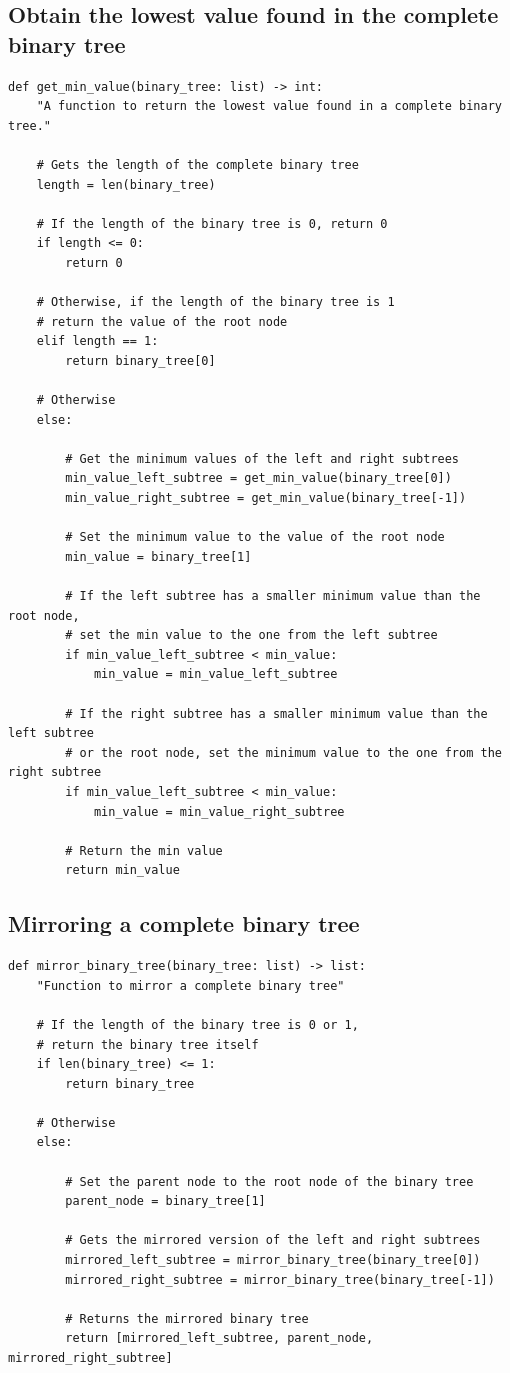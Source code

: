 \documentclass[11pt]{article}
\begin{document}
\subsection{Obtain the lowest value found in the complete binary tree}
\label{sec:org2b8926c}
\begin{verbatim}
def get_min_value(binary_tree: list) -> int:
    "A function to return the lowest value found in a complete binary tree."

    # Gets the length of the complete binary tree
    length = len(binary_tree)

    # If the length of the binary tree is 0, return 0
    if length <= 0:
        return 0

    # Otherwise, if the length of the binary tree is 1
    # return the value of the root node
    elif length == 1:
        return binary_tree[0]

    # Otherwise
    else:

        # Get the minimum values of the left and right subtrees
        min_value_left_subtree = get_min_value(binary_tree[0])
        min_value_right_subtree = get_min_value(binary_tree[-1])

        # Set the minimum value to the value of the root node
        min_value = binary_tree[1]

        # If the left subtree has a smaller minimum value than the root node,
        # set the min value to the one from the left subtree
        if min_value_left_subtree < min_value:
            min_value = min_value_left_subtree

        # If the right subtree has a smaller minimum value than the left subtree
        # or the root node, set the minimum value to the one from the right subtree
        if min_value_left_subtree < min_value:
            min_value = min_value_right_subtree

        # Return the min value
        return min_value
\end{verbatim}

\subsection{Mirroring a complete binary tree}
\label{sec:org4645fd0}
\begin{verbatim}
def mirror_binary_tree(binary_tree: list) -> list:
    "Function to mirror a complete binary tree"

    # If the length of the binary tree is 0 or 1,
    # return the binary tree itself
    if len(binary_tree) <= 1:
        return binary_tree

    # Otherwise
    else:

        # Set the parent node to the root node of the binary tree
        parent_node = binary_tree[1]

        # Gets the mirrored version of the left and right subtrees
        mirrored_left_subtree = mirror_binary_tree(binary_tree[0])
        mirrored_right_subtree = mirror_binary_tree(binary_tree[-1])

        # Returns the mirrored binary tree
        return [mirrored_left_subtree, parent_node, mirrored_right_subtree]
\end{verbatim}
\end{document}
